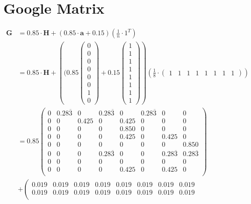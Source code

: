 \chapter{Google Matrix}
\begin{align*}
\textbf{G} &  = 0.85\cdot\textbf{H} + (0.85\cdot\textbf{a} + 0.15)\left(\frac{1}{n}\cdot 1^T\right)\\
& = 0.85\cdot\textbf{H} + \left((0.85\left(\begin{array}{c}
0\\0\\0\\0\\0\\0\\1\\0\end{array}\right) + 0.15\left(\begin{array}{c}
1\\1\\1\\1\\1\\1\\1\\1\end{array}\right)\right)\left(\frac{1}{8}\cdot\left(\begin{array}{cccccccc}
1&1&1&1&1&1&1&1\end{array}\right)\right)\\
&= 0.85\left(
\begin{array}{cccccccc}
0 & 0.28\overline{3} & 0 & 0.28\overline{3} & 0 & 0.28\overline{3} & 0 & 0  \\
0 & 0 & 0.425 & 0 & 0.425 & 0 & 0 & 0  \\
0 & 0 & 0 & 0 & 0.850 & 0 & 0 & 0  \\
0 & 0 & 0 & 0 & 0.425 & 0 & 0.425 & 0  \\
0 & 0 & 0 & 0 & 0 & 0 & 0 & 0.850  \\
0 & 0 & 0 & 0.28\overline{3} & 0 & 0 & 0.28\overline{3} & 0.28\overline{3}  \\
0 & 0 & 0 & 0 & 0 & 0 & 0 & 0  \\
0 & 0 & 0 & 0 & 0.425 & 0 & 0.425 & 0  \\
\end{array}
\right) \\&+ \left(
\begin{array}{cccccccc}
0.019 & 0.019 & 0.019 & 0.019 & 0.019 & 0.019 & 0.019 & 0.019  \\
0.019 & 0.019 & 0.019 & 0.019 & 0.019 & 0.019 & 0.019 & 0.019  \\

\end{array}
\end{align*}
